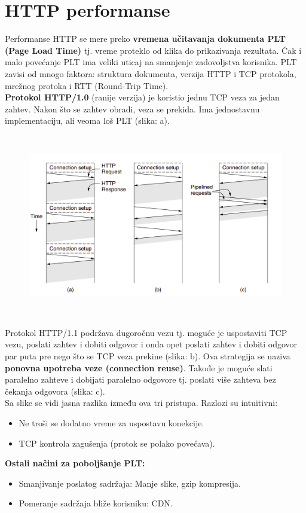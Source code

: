 \documentclass[a4paper]{article}
\begin{document}
\section{HTTP performanse}
    Performanse HTTP se mere preko \textbf{vremena učitavanja dokumenta PLT (Page Load Time)} tj.
    vreme proteklo od klika do prikazivanja rezultata. Čak i malo povećanje PLT ima veliki uticaj
    na smanjenje zadovoljstva korisnika. PLT zavisi od mnogo faktora: struktura dokumenta,
    verzija HTTP i TCP protokola, mrežnog protoka i RTT (Round-Trip Time).\\
    \indent \textbf{Protokol HTTP/1.0} (ranije verzija) je koristio jednu TCP veza za jedan zahtev. 
    Nakon što se zahtev obradi, veza se prekida. Ima jednostavnu implementaciju, 
    ali veoma loš PLT (slika: a). 
    \begin{figure}[H]
        \begin{center}
            \includegraphics[width=120mm,height=80mm]{Slike/http7.png}
        \end{center}
    \end{figure}
    Protokol HTTP/1.1 podržava dugoročnu vezu tj. moguće je uspostaviti TCP vezu, poslati
    zahtev i dobiti odgovor i onda opet poslati zahtev i dobiti odgovor par puta pre nego što se
    TCP veza prekine (slika: b). Ova strategija se naziva 
    \textbf{ponovna upotreba veze (connection reuse)}. Takođe je moguće slati paralelno zahteve
    i dobijati paralelno odgovore tj. poslati više zahteva bez čekanja odgovora (slika: c). \\
    \indent Sa slike se vidi jasna razlika između ova tri pristupa. Razlozi su intuitivni:
    \begin{itemize}
        \item Ne troši se dodatno vreme za uspostavu konekcije.
        \item TCP kontrola zagušenja (protok se polako povećava).
    \end{itemize}
    \textbf{Ostali načini za poboljšanje PLT:}
    \begin{itemize}
        \item Smanjivanje poslatog sadržaja: Manje slike, gzip kompresija.
        \item Pomeranje sadržaja bliže korisniku: CDN.
    \end{itemize}
    
\end{document}
